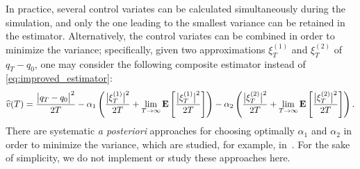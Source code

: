 \documentclass[11pt,a4paper]{article}
\begin{document}
\begin{remark}
    In practice,
    several control variates can be calculated simultaneously during the simulation,
    and only the one leading to the smallest variance can be retained in the estimator.
    Alternatively, the control variates can be combined in order to minimize the variance;
    specifically, given two approximations $\xi^{(1)}_T$ and $\xi^{(2)}_T$ of $q_T - q_0$,
    one may consider the following composite estimator instead of \eqref{eq:improved_estimator}:
    \[
        \widehat v(T) =  \frac{\bigl\lvert q_T - q_0 \bigr\rvert^2}{2T}
        - \alpha_1 \left( \frac{\bigl\lvert \xi^{(1)}_T \bigr\rvert^2}{2T} + \lim_{T \to \infty} \mathbf{E} \left[\frac{\bigl\lvert \xi^{(1)}_T \bigr\rvert^2}{2T}\right] \right)
        - \alpha_2 \left( \frac{\bigl\lvert \xi^{(2)}_T \bigr\rvert^2}{2T} + \lim_{T \to \infty} \mathbf{E} \left[\frac{\bigl\lvert \xi^{(2)}_T \bigr\rvert^2}{2T}\right] \right).
    \]
    There are systematic \emph{a posteriori} approaches for choosing optimally $\alpha_1$ and $\alpha_2$ in order to minimize the variance,
    which are studied, for example, in~\cite{MR1958845}.
    For the sake of simplicity, we do not implement or study these approaches here.
\end{remark}
\end{document}
